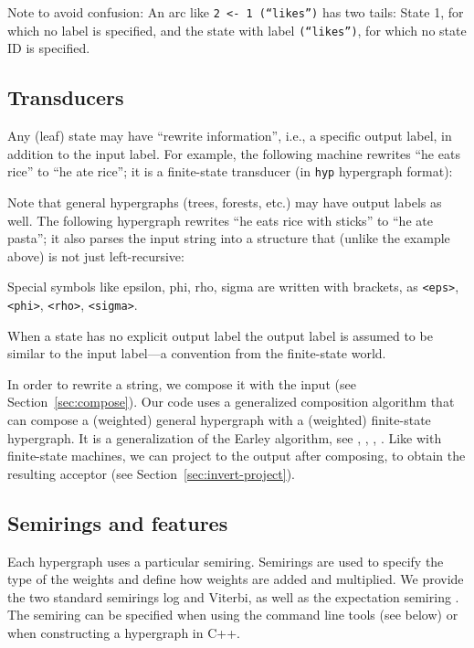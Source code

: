 \documentclass[12pt]{article}
\newcommand{\yellowlisting}[1]{%
  }
\newcommand{\hyp}{\texttt{hyp}\xspace}
\newcommand{\code}[1]{\texttt{#1}}
\newcommand{\secref}[1]{Section~\ref{sec:#1}}
\let\cite\citep    %
\begin{document}
Note to avoid confusion: An arc like \code{2 <- 1 (``likes'')} has two
tails: State 1, for which no label is specified, and the state with
label \code{(``likes'')}, for which no state ID is specified.

\subsection{Transducers}

Any (leaf) state may have ``rewrite information'', i.e., a specific
output label, in addition to the input label. For example, the
following machine rewrites ``he eats rice'' to ``he ate rice''; it is
a finite-state transducer (in \hyp hypergraph format):
\yellowlisting{fig/fst.hyp}

Note that general hypergraphs (trees, forests, etc.) may have output
labels as well. The following hypergraph rewrites ``he eats rice with
sticks'' to ``he ate pasta''; it also parses the input string into a
structure that (unlike the example above) is not just left-recursive:
\yellowlisting{fig/tree_transduce.hyp}

Special symbols like epsilon, phi, rho, sigma are written with
brackets, as \code{<eps>}, \code{<phi>}, \code{<rho>}, \code{<sigma>}.

When a state has no explicit output label the output label is assumed
to be similar to the input label---a convention from the finite-state
world.

In order to rewrite a string, we compose it with the input (see
\secref{compose}). Our code uses a generalized composition algorithm
that can compose a (weighted) general hypergraph with a (weighted)
finite-state hypergraph. It is a generalization of the Earley
algorithm, see \cite{earley_efficient_1970},
\cite{stolcke_efficient_1995}, \cite{ eisner_compiling_2005},
\cite{dyer_formal_2010}. Like with finite-state machines, we can
project to the output after composing, to obtain the resulting
acceptor (see \secref{invert-project}).

\subsection{Semirings and features}\label{sec:semirings}

Each hypergraph uses a particular semiring. Semirings are used to
specify the type of the weights and define how weights are added and
multiplied.  We provide the two standard semirings log and Viterbi, as
well as the expectation semiring \cite{eisner-2002-acl-fst}. The
semiring can be specified when using the command line tools (see
below) or when constructing a hypergraph in C++.
\end{document}
